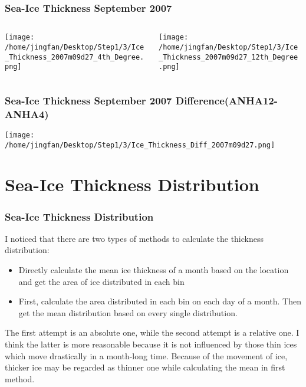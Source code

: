\documentclass{beamer}
\begin{document}
\begin{frame}
\frametitle{Sea-Ice Thickness September 2007}

\begin{columns}
\begin{column}[t]{0.5\linewidth}
\centering
\texttt{[image: /home/jingfan/Desktop/Step1/3/Ice\_Thickness\_2007m09d27\_4th\_Degree.png]}
\end{column}
\begin{column}[t]{0.5\linewidth}
\centering
\texttt{[image: /home/jingfan/Desktop/Step1/3/Ice\_Thickness\_2007m09d27\_12th\_Degree.png]}
\end{column}
\end{columns}

\end{frame}

\begin{frame}
\frametitle{Sea-Ice Thickness September 2007 Difference(ANHA12-ANHA4)}

\texttt{[image: /home/jingfan/Desktop/Step1/3/Ice\_Thickness\_Diff\_2007m09d27.png]}

\end{frame}

\section{Sea-Ice Thickness Distribution}
\begin{frame}
\frametitle{Sea-Ice Thickness Distribution}

I noticed that there are two types of methods to calculate the thickness distribution: 

\begin{itemize}

\item Directly calculate the mean ice thickness of a month based on the location and get the area of ice distributed in each bin
\item First, calculate the area distributed in each bin on each day of a month. Then get the mean distribution based on every single distribution.


\end{itemize}

The first attempt is an absolute one, while the second attempt is a relative one. I think the latter is more reasonable because it is not influenced by those thin ices which move drastically in a month-long time. Because of the movement of ice, thicker ice may be regarded as thinner one while calculating the mean in first method.

\end{frame}
\end{document}

